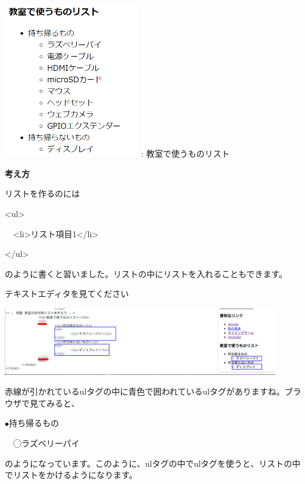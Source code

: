 \documentclass[a4paper,12pt]{jarticle}
\begin{document}
\bigskip
\centering
\begin{minipage}{5.937cm}
  {\upshape
    \includegraphics[width=5.937cm]{textbook-img203.png}
    \newline
    : 教室で使うものリスト}
\end{minipage}

\bigskip
\flushleft

\textbf{考え方}



リストを作るのには

{\textless}ul{\textgreater}

\ \ {\textless}li{\textgreater}リスト項目1{\textless}/li{\textgreater}

{\textless}/ul{\textgreater}

のように書くと習いました。リストの中にリストを入れることもできます。

テキストエディタを見てください

\bigskip

\centering
\includegraphics[width=0.9\textwidth]{textbook-img204.png}

\bigskip
\flushleft

赤線が引かれているulタグの中に青色で囲われているulタグがありますね。ブラウザで見てみると、

${\bullet}持ち帰るもの$

\ \ ◯ラズベリーパイ

のようになっています。このように、ulタグの中でulタグを使うと、リストの中でリストをかけるようになります。
\end{document}

